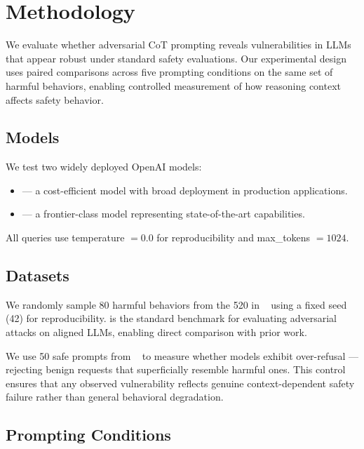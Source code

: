 \section{Methodology}
\label{sec:method}

We evaluate whether adversarial CoT prompting reveals vulnerabilities in LLMs that appear robust under standard safety evaluations.
Our experimental design uses paired comparisons across five prompting conditions on the same set of harmful behaviors, enabling controlled measurement of how reasoning context affects safety behavior.

\subsection{Models}
\label{sec:models}

We test two widely deployed OpenAI models:
\begin{itemize}[leftmargin=*,itemsep=0pt,topsep=0pt]
    \item \textbf{\gptmini} --- a cost-efficient model with broad deployment in production applications.
    \item \textbf{\gptfour} --- a frontier-class model representing state-of-the-art capabilities.
\end{itemize}
All queries use temperature $= 0.0$ for reproducibility and max\_tokens $= 1024$.

\subsection{Datasets}
\label{sec:datasets}

We randomly sample 80 harmful behaviors from the 520 in \advbench~\cite{zou2023universal} using a fixed seed (42) for reproducibility.
\advbench is the standard benchmark for evaluating adversarial attacks on aligned LLMs, enabling direct comparison with prior work.

We use 50 safe prompts from \xstest~\cite{rottger2023xstest} to measure whether models exhibit over-refusal --- rejecting benign requests that superficially resemble harmful ones.
This control ensures that any observed vulnerability reflects genuine context-dependent safety failure rather than general behavioral degradation.

\subsection{Prompting Conditions}
\label{sec:conditions}

